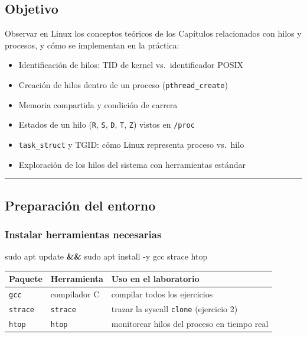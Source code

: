 \documentclass[
  spanish,
]{article}
\newenvironment{Shaded}{}{}
\newcommand{\AttributeTok}[1]{\textcolor[rgb]{0.49,0.56,0.16}{#1}}
\newcommand{\FunctionTok}[1]{\textcolor[rgb]{0.02,0.16,0.49}{#1}}
\newcommand{\KeywordTok}[1]{\textcolor[rgb]{0.00,0.44,0.13}{\textbf{#1}}}
\newcommand{\NormalTok}[1]{#1}
\newcounter{none} %
\providecommand{\tightlist}{%
  \setlength{\itemsep}{0pt}\setlength{\parskip}{0pt}}
\begin{document}
\subsection{Objetivo}\label{objetivo}

Observar en Linux los conceptos teóricos de los Capítulos relacionados
con hilos y procesos, y cómo se implementan en la práctica:

\begin{itemize}
\tightlist
\item
  Identificación de hilos: TID de kernel vs.~identificador POSIX
\item
  Creación de hilos dentro de un proceso (\texttt{pthread\_create})
\item
  Memoria compartida y condición de carrera
\item
  Estados de un hilo (\texttt{R}, \texttt{S}, \texttt{D}, \texttt{T},
  \texttt{Z}) vistos en \texttt{/proc}
\item
  \texttt{task\_struct} y TGID: cómo Linux representa proceso vs.~hilo
\item
  Exploración de los hilos del sistema con herramientas estándar
\end{itemize}

\begin{center}\rule{0.5\linewidth}{0.5pt}\end{center}

\subsection{Preparación del entorno}\label{preparaciuxf3n-del-entorno}

\subsubsection{Instalar herramientas
necesarias}\label{instalar-herramientas-necesarias}

\begin{Shaded}
\begin{Highlighting}[]
\FunctionTok{sudo}\NormalTok{ apt update }\KeywordTok{\&\&} \FunctionTok{sudo}\NormalTok{ apt install }\AttributeTok{{-}y}\NormalTok{ gcc strace htop}
\end{Highlighting}
\end{Shaded}

{\def\LTcaptype{none} %
\begin{longtable}[]{@{}lll@{}}
\toprule\noalign{}
Paquete & Herramienta & Uso en el laboratorio \\
\midrule\noalign{}
\endhead
\bottomrule\noalign{}
\endlastfoot
\texttt{gcc} & compilador C & compilar todos los ejercicios \\
\texttt{strace} & \texttt{strace} & trazar la syscall \texttt{clone}
(ejercicio 2) \\
\texttt{htop} & \texttt{htop} & monitorear hilos del proceso en tiempo
real \\
\end{longtable}
}
\end{document}
